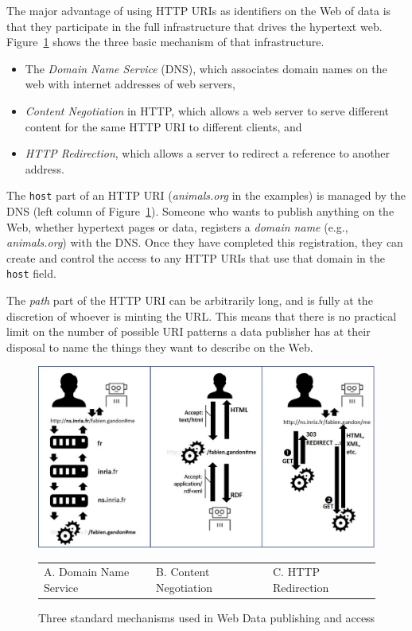 The major advantage of using HTTP URIs as identifiers on the  Web  of data is that
they participate in the full infrastructure that drives the hypertext web.  Figure~\ref{fig:ch5.2} shows the three basic mechanism of that infrastructure. 
\begin{itemize}
    \item The \emph{Domain Name Service} (DNS), which associates domain names on the web with internet addresses of web servers,
    \item \emph{Content Negotiation} in HTTP, which allows a web 
     server to serve different content for the same HTTP URI to different
     clients, and
     \item \emph{HTTP Redirection}, which allows a server to redirect a reference
     to another address.
\end{itemize}
The \texttt{host} part of an HTTP URI (\emph{animals.org} in the examples) is managed by 
the DNS (left column of Figure~\ref{fig:ch5.2}).   Someone who wants to publish 
anything on the Web, whether hypertext pages or data, registers a \emph{domain 
name} (e.g., \emph{animals.org}) with the DNS.  Once they have completed this registration, they 
can create and control the access to
any HTTP URIs  that use that domain in the \texttt{host} field. 

The \emph{path} part of the HTTP URI can be arbitrarily long, and is fully at the discretion of
whoever is minting the URL.  This means that there is 
no practical limit on the number of possible URI patterns a data publisher has  at their disposal to name the things they
want to describe on the Web. 

\begin{figure}
    \centering
        \includegraphics[width=5.0in]{media/ch5/figure-05-02.jpg}
        \begin{tabular}{lll}
        A. Domain Name Service\ \ \ \ \ \ &B. Content Negotiation\ \ \ \ \ &C. HTTP Redirection\ \ \ \  \\
        \end{tabular}
    \caption{Three standard mechanisms used in Web Data publishing and
access}
    \label{fig:ch5.2}
\end{figure}

